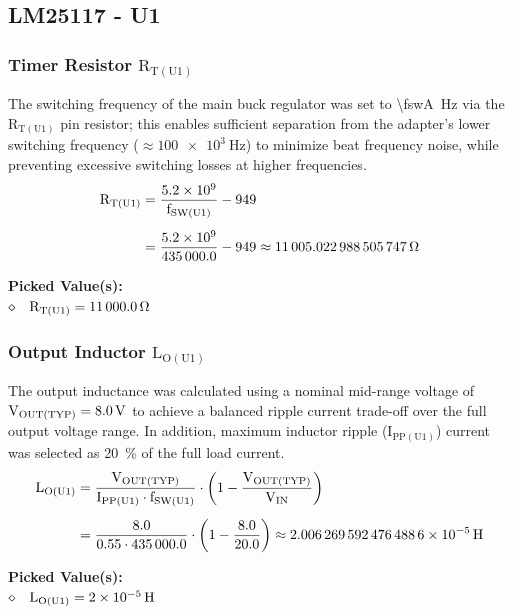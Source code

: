 \documentclass[11pt, a4paper]{article}
\begin{document}
\subsection{LM25117 - U1}
\subsubsection{Timer Resistor \texorpdfstring{$\mathrm{R_{T(U1)}}$}{RT(U1)}}
The switching frequency of the main buck regulator was set to \qty{\fswA}{\hertz} via the $\mathrm{R_{T(U1)}}$ pin resistor; 
this enables sufficient separation from the adapter's lower switching frequency ($\approx \qty{100e3}{\hertz}$) to minimize beat frequency noise, while preventing excessive switching losses at higher frequencies.
\begin{align}
\mathrm{R_{T(U1)}} &= \frac{\num{5.2e9}}{\mathrm{f_{SW(U1)}}} - 949 \nonumber \\[0.5em]
                   &= \frac{\num{5.2e9}}{\num{435000.0}} - 949 \approx \qty{11005.022988505747}{\ohm}
\end{align}
\begin{pickedbox}
\small\textbf{Picked Value(s):}\\[0.5em]
$\diamond\quad \mathrm{R_{T(U1)}} = \qty{11000.0}{\ohm}$
\end{pickedbox}

\subsubsection{Output Inductor \texorpdfstring{$\mathrm{L_{O(U1)}}$}{LO(U1)}}
The output inductance was calculated using a nominal mid-range voltage of $\mathrm{V_{OUT(TYP)}} = \qty{8.0}{\volt}$ to achieve a balanced ripple current trade-off over the full output voltage range. 
In addition, maximum inductor ripple ($\mathrm{I_{PP(U1)}}$) current was selected as \qty{20}{\percent} of the full load current.
\begin{align}
\mathrm{L_{O(U1)}} &= \frac{\mathrm{V_{OUT(TYP)}}}{\mathrm{I_{PP(U1)}} \cdot \mathrm{f_{SW(U1)}}} \cdot \left(1 - \frac{\mathrm{V_{OUT(TYP)}}}{\mathrm{V_{IN}}}\right) \nonumber  \\[0.5em]
                   &= \frac{\VoutTyp}{\IppA \cdot \num{\fswA}} \cdot \left(1 - \frac{\VoutTyp}{\Vin}\right) \approx \qty{\CalcLoA}{\henry}
\end{align}
\begin{pickedbox}
\small\textbf{Picked Value(s):}\\[0.5em]
$\diamond\quad \mathrm{L_{O(U1)}} = \qty{\LoA}{\henry}$
\end{pickedbox}
\end{document}
